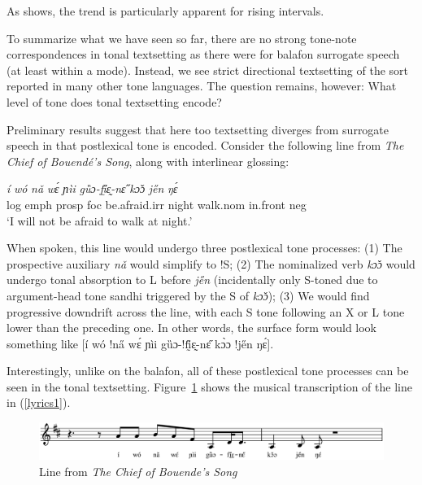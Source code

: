 \documentclass[output=paper]{langscibook}
\begin{document}
As  shows, the trend is particularly apparent for rising intervals. 

To summarize what we have seen so far, there are no strong tone-note correspondences in tonal textsetting as there were for balafon surrogate speech (at least within a mode). Instead, we see strict directional textsetting of the sort reported in many other tone languages. The question remains, however: What level of tone does tonal textsetting encode? 

Preliminary results suggest that here too textsetting diverges from surrogate speech in that postlexical tone is encoded. Consider the following line from \textit{The Chief of Bouendé's Song}, along with interlinear glossing:

\ea\label{lyrics1} 
\gll \textit{í} \textit{wó} \textit{nǎ} \textit{wɛ́} \textit{ɲìi} \textit{gȕɔ-fḭ̋ɛ̰-nɛ̋} \textit{kɔ̌ɔ} \textit{je̋n} \textit{ŋɛ́} \\
{\sc log} {\sc emph} {\sc prosp} {\sc foc} be.afraid.{\sc irr} night walk.{\sc nom} in.front {\sc neg} \\
\glt `I will not be afraid to walk at night.'
\z 

When spoken, this line would undergo three postlexical tone processes: (1) The prospective auxiliary \textit{nǎ} would simplify to !S; (2) The nominalized verb \textit{kɔ̌ɔ} would undergo tonal absorption to L before \textit{je̋n} (incidentally only S-toned due to argument-head tone sandhi triggered by the S of \textit{kɔ̌ɔ}); (3)  We would find progressive downdrift across the line, with each S tone following an X or L tone lower than the preceding one. In other words, the surface form would look something like [í wó !na̋ wɛ́ ɲìi gȕɔ-!fḭ̋ɛ̰-nɛ̋ kɔ̀ɔ !je̋n ŋɛ́]. 

Interestingly, unlike on the balafon, all of these postlexical tone processes can be seen in the tonal textsetting. Figure~\ref{fig:songline:bouendechief} shows the musical transcription of the line in (\ref{lyrics1}). 

 \begin{figure}
  \includegraphics[width=\textwidth]{figures/scared-line.eps}
  \caption{Line from \textit{The Chief of Bouende's Song}\label{fig:songline:bouendechief}}
\end{figure}
\end{document}
